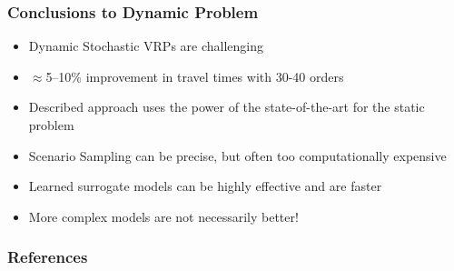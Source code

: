 \documentclass[aspectratio=1610]{beamer}
\newcommand{\important}[1]{{\color{green!60!black}#1}}
\begin{document}
\begin{frame}
	\frametitle{Conclusions to Dynamic Problem}
	
	\begin{itemize}
		\itemsep2ex
		\item \important{Dynamic Stochastic VRPs} are challenging
		\item $\approx$5--10\% improvement in travel times with 30-40 orders
		\item Described approach uses the power of the state-of-the-art for the static problem
		\item \important{Scenario Sampling} can be precise, but often too computationally expensive
		\item Learned \important{surrogate models} can be highly effective and are faster
		\item \important{More complex models are not necessarily better!}
	\end{itemize}
\end{frame}
	

	



	
	
	






\begin{frame}[allowframebreaks]
	\frametitle{References}
	\small
	
\end{frame}


\end{document}

